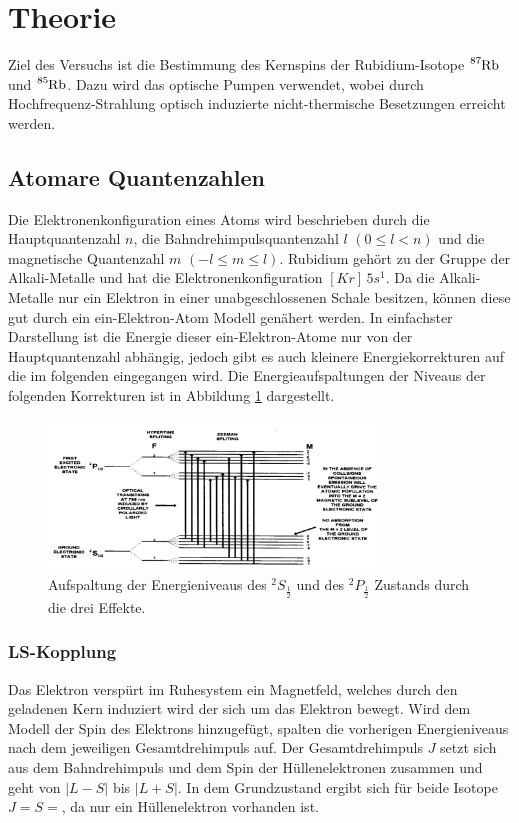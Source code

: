 \section{Theorie}
\label{sec:Theorie}
Ziel des Versuchs ist die Bestimmung des Kernspins der Rubidium-Isotope $\ce{^{87}Rb}$ und $\ce{^{85}Rb}$.
Dazu wird das optische Pumpen verwendet, wobei durch Hochfrequenz-Strahlung optisch induzierte nicht-thermische Besetzungen erreicht werden.

\subsection{Atomare Quantenzahlen}
Die Elektronenkonfiguration eines Atoms wird beschrieben durch die Hauptquantenzahl $n$, die Bahndrehimpulsquantenzahl $l$ $(0 \leq l < n)$ und die
magnetische Quantenzahl $m$ $(-l \leq m \leq l)$. 
Rubidium gehört zu der Gruppe der Alkali-Metalle und hat die
Elektronenkonfiguration $[Kr]\,5s^1$. 
Da die Alkali-Metalle nur ein Elektron in einer unabgeschlossenen Schale besitzen, können diese gut durch ein ein-Elektron-Atom Modell genähert werden.
In einfachster Darstellung ist die Energie dieser ein-Elektron-Atome nur von der Hauptquantenzahl abhängig, jedoch gibt es auch kleinere Energiekorrekturen
auf die im folgenden eingegangen wird. Die Energieaufspaltungen der Niveaus der folgenden Korrekturen ist in Abbildung \ref{pic:en} dargestellt.
\begin{figure}
    \centering
    \includegraphics[width = 0.78\textwidth]{pics/energielevel.png}
    \caption{Aufspaltung der Energieniveaus des $^2S_{\frac{1}{2}}$ und des $^2P_{\frac{1}{2}}$ Zustands durch die drei Effekte.\cite{Optisches pumpen}}
    \label{pic:en}
\end{figure}

\subsubsection{LS-Kopplung}
Das Elektron verspürt im Ruhesystem ein Magnetfeld, welches durch den geladenen Kern induziert wird der sich um das Elektron bewegt.
Wird dem Modell der Spin des Elektrons hinzugefügt, spalten die vorherigen Energieniveaus nach dem jeweiligen Gesamtdrehimpuls auf.
Der Gesamtdrehimpuls $J$ setzt sich aus dem Bahndrehimpuls und dem Spin der Hüllenelektronen zusammen und geht von $|L - S|$ bis $|L + S|$.
In dem Grundzustand ergibt sich für beide Isotope $J = S =$, da nur ein Hüllenelektron vorhanden ist.

